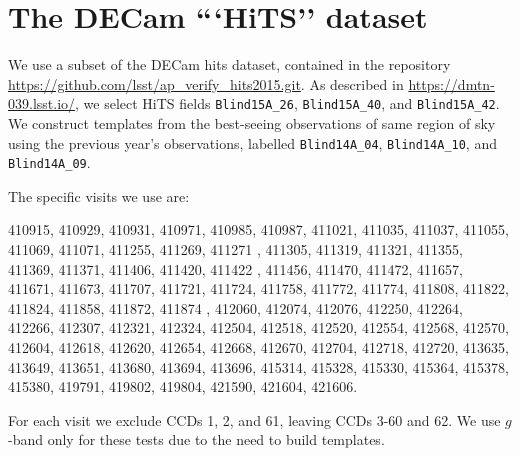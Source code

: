 \documentclass[DM,lsstdraft,STS,toc]{lsstdoc}
\begin{document}



\appendix

\section{The DECam ```HiTS'' dataset}

We use a subset of the DECam hits dataset, contained in the repository
\url{https://github.com/lsst/ap\_verify\_hits2015.git}.  As described in
\url{https://dmtn-039.lsst.io/}, we select HiTS fields \texttt{Blind15A\_26},
\texttt{Blind15A\_40}, and \texttt{Blind15A\_42}. We construct templates from the best-seeing observations of
same region of sky using the previous year's observations, labelled
\texttt{Blind14A\_04}, \texttt{Blind14A\_10}, and \texttt{Blind14A\_09}.

The specific visits we use are:

410915, 410929, 410931, 410971, 410985, 410987, 411021, 411035,
        411037, 411055, 411069, 411071, 411255, 411269, 411271 , 411305,
        411319, 411321, 411355, 411369, 411371, 411406, 411420, 411422 ,
        411456, 411470, 411472, 411657, 411671, 411673, 411707, 411721, 411724,
        411758, 411772, 411774, 411808, 411822, 411824, 411858, 411872,
        411874 , 412060, 412074, 412076, 412250, 412264, 412266, 412307,
        412321, 412324, 412504, 412518, 412520, 412554, 412568, 412570, 412604,
        412618, 412620, 412654, 412668, 412670, 412704, 412718, 412720, 413635,
        413649, 413651, 413680, 413694, 413696, 415314, 415328, 415330, 415364,
        415378, 415380, 419791, 419802, 419804, 421590, 421604, 421606.

For each visit we exclude CCDs 1, 2, and 61, leaving CCDs 3-60 and 62.  We use $g$-band only for these tests due to the need to build templates.
\end{document}
